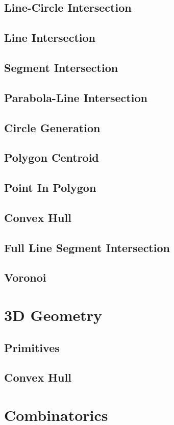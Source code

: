 \documentclass[twocolumn]{article}
\begin{document}
		\subsection{Line-Circle Intersection}
		\subsection{Line Intersection}
		\subsection{Segment Intersection}
		\subsection{Parabola-Line Intersection}
		\subsection{Circle Generation}
		\subsection{Polygon Centroid}
		
		\subsection{Point In Polygon}
		\subsection{Convex Hull}
		\subsection{Full Line Segment Intersection}
		\subsection{Voronoi}
	\section{3D Geometry}
		\subsection{Primitives}
		\subsection{Convex Hull}
	\section{Combinatorics}
\end{document}
